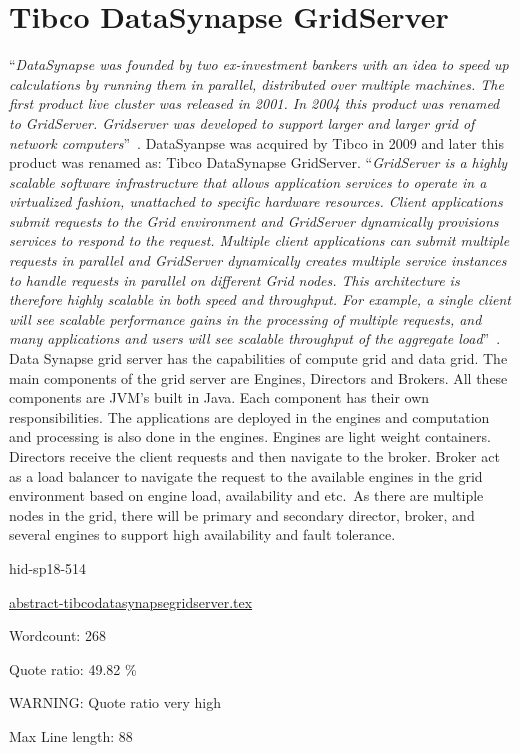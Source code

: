 \section{Tibco DataSynapse GridServer}

\color{blue}``\emph{DataSynapse was founded by two ex-investment bankers with an idea to
speed up calculations by running them in parallel, distributed over
multiple machines. The first product live cluster was released in
2001. In 2004 this product was renamed to GridServer. Gridserver was
developed to support larger and larger grid of network
computers}''\color{black}~\cite{hid-sp18-514-datasynapsewiki}. DataSyanpse was
acquired by Tibco in 2009 and later this product was renamed as: Tibco
DataSynapse GridServer\cite{hid-sp18-514-tibcodatasynapsewiki}.
\color{blue}``\emph{GridServer is a highly scalable software infrastructure that allows
application services to operate in a virtualized fashion, unattached
to specific hardware resources. Client applications submit requests to
the Grid environment and GridServer dynamically provisions services to
respond to the request. Multiple client applications can submit
multiple requests in parallel and GridServer dynamically creates
multiple service instances to handle requests in parallel on different
Grid nodes. This architecture is therefore highly scalable in both
speed and throughput. For example, a single client will see scalable
performance gains in the processing of multiple requests, and many
applications and users will see scalable throughput of the aggregate
load}''\color{black}~\cite{hid-sp18-514-tibcods}. Data Synapse grid server has the
capabilities of compute grid and data grid. The main components of the
grid server are Engines, Directors and Brokers. All these components
are JVM’s built in Java. Each component has their own
responsibilities. The applications are deployed in the engines and
computation and processing is also done in the engines. Engines are
light weight containers. Directors receive the client requests and
then navigate to the broker. Broker act as a load balancer to navigate
the request to the available engines in the grid environment based on
engine load, availability and etc.\ As there are multiple nodes in the
grid, there will be primary and secondary director, broker, and
several engines to support high availability and fault
tolerance\cite{hid-sp18-514-tibcods}.



\begin{IU}

hid-sp18-514

\href{https://github.com/cloudmesh-community/hid-sp18-514/blob/master//technology/abstract-tibcodatasynapsegridserver.tex}{abstract-tibcodatasynapsegridserver.tex}

 

Wordcount: 268


Quote ratio: 49.82 \%

WARNING: Quote ratio very high
 
Max Line length: 88
\end{IU}

